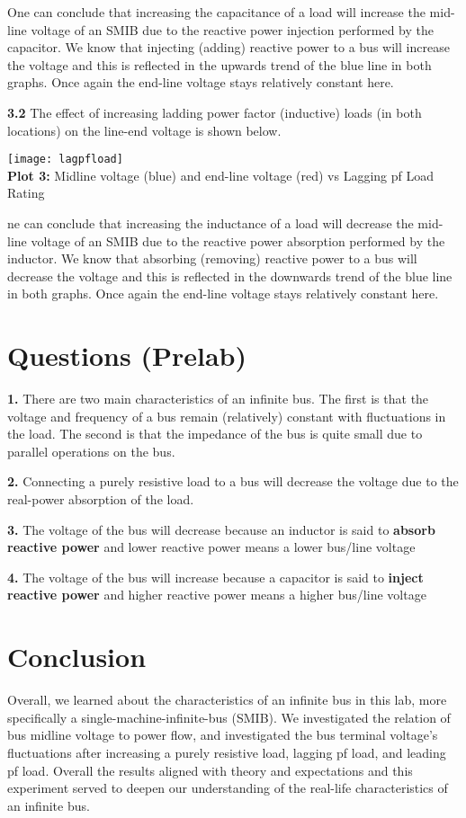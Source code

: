\documentclass[]{report}
\begin{document}
One can conclude that increasing the capacitance of a load will increase the mid-line voltage of an SMIB due to the reactive power injection performed by the capacitor. We know that injecting (adding) reactive power to a bus will increase the voltage and this is reflected in the upwards trend of the blue line in both graphs. Once again the end-line voltage stays relatively constant here.

\textbf{3.2} The effect of increasing ladding power factor (inductive) loads (in both locations) on the line-end voltage is shown below.


\begin{center}
	\texttt{[image: lagpfload]} \\ 
	\textbf{Plot 3:} Midline voltage (blue) and end-line voltage (red) vs Lagging pf Load Rating
\end{center}

ne can conclude that increasing the inductance of a load will decrease the mid-line voltage of an SMIB due to the reactive power absorption performed by the inductor. We know that absorbing (removing) reactive power to a bus will decrease the voltage and this is reflected in the downwards trend of the blue line in both graphs. Once again the end-line voltage stays relatively constant here.

\section*{Questions (Prelab)}

\textbf{1.} There are two main characteristics of an infinite bus. The first is that the voltage and frequency of a bus remain (relatively) constant with fluctuations in the load. The second is that the impedance of the bus is quite small due to parallel operations on the bus.

\textbf{2.} Connecting a purely resistive load to a bus will decrease the voltage due to the real-power absorption of the load.

\textbf{3.} The voltage of the bus will decrease because an inductor is said to \textbf{absorb reactive power} and lower reactive power means a lower bus/line voltage

\textbf{4.} The voltage of the bus will increase because a capacitor is said to \textbf{inject reactive power} and higher reactive power means a higher bus/line voltage

\section*{Conclusion}

Overall, we learned about the characteristics of an infinite bus in this lab, more specifically a single-machine-infinite-bus (SMIB). We investigated the relation of bus midline voltage to power flow, and investigated the bus terminal voltage's fluctuations after increasing a purely resistive load, lagging pf load, and leading pf load. Overall the results aligned with theory and expectations and this experiment served to deepen our understanding of the real-life characteristics of an infinite bus.
\end{document}
